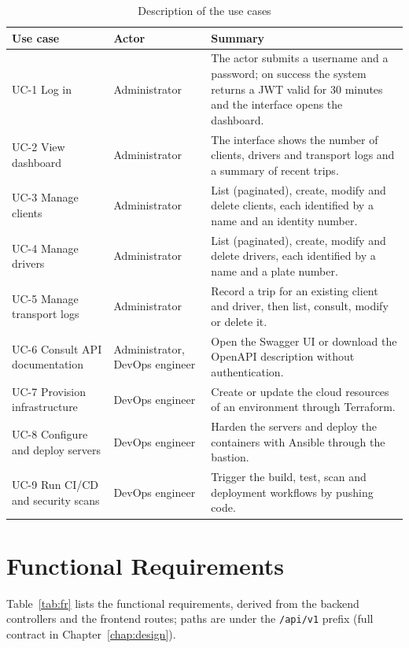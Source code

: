 \begin{table}[htbp]
\centering
\footnotesize
\caption{Description of the use cases}
\label{tab:use-cases}
\renewcommand{\arraystretch}{1.1}
\begin{tabularx}{\linewidth}{@{}l>{\raggedright\arraybackslash}p{2.4cm}>{\raggedright\arraybackslash}X@{}}
\toprule
\textbf{Use case} & \textbf{Actor} & \textbf{Summary} \\
\midrule
UC-1 Log in & Administrator & The actor submits a username and a password; on success the system returns a JWT valid for 30 minutes and the interface opens the dashboard. \\
UC-2 View dashboard & Administrator & The interface shows the number of clients, drivers and transport logs and a summary of recent trips. \\
UC-3 Manage clients & Administrator & List (paginated), create, modify and delete clients, each identified by a name and an identity number. \\
UC-4 Manage drivers & Administrator & List (paginated), create, modify and delete drivers, each identified by a name and a plate number. \\
UC-5 Manage transport logs & Administrator & Record a trip for an existing client and driver, then list, consult, modify or delete it. \\
UC-6 Consult API documentation & Administrator, DevOps engineer & Open the Swagger UI or download the OpenAPI description without authentication. \\
UC-7 Provision infrastructure & DevOps engineer & Create or update the cloud resources of an environment through Terraform. \\
UC-8 Configure and deploy servers & DevOps engineer & Harden the servers and deploy the containers with Ansible through the bastion. \\
UC-9 Run CI/CD and security scans & DevOps engineer & Trigger the build, test, scan and deployment workflows by pushing code. \\
\bottomrule
\end{tabularx}
\end{table}

\section{Functional Requirements}
\label{sec:fr}

Table~\ref{tab:fr} lists the functional requirements, derived from the backend controllers and the frontend routes; paths are under the \texttt{/api/v1} prefix (full contract in Chapter~\ref{chap:design}).

